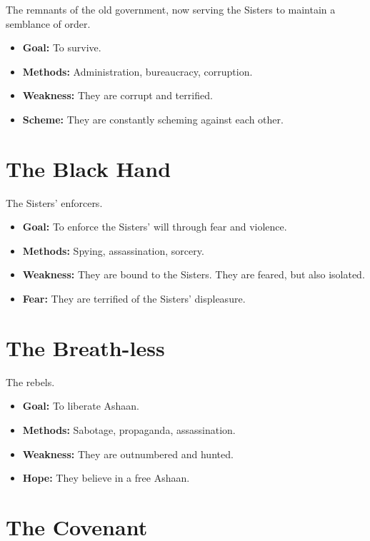 \documentclass[11pt,twoside]{book}
\begin{document}
The remnants of the old government, now serving the Sisters to maintain a semblance of order.

\begin{itemize}
    \item \textbf{Goal:} To survive.
    \item \textbf{Methods:} Administration, bureaucracy, corruption.
    \item \textbf{Weakness:} They are corrupt and terrified.
    \item \textbf{Scheme:} They are constantly scheming against each other.
\end{itemize}

\section{The Black Hand}

The Sisters' enforcers.

\begin{itemize}
    \item \textbf{Goal:} To enforce the Sisters' will through fear and violence.
    \item \textbf{Methods:} Spying, assassination, sorcery.
    \item \textbf{Weakness:} They are bound to the Sisters. They are feared, but also isolated.
    \item \textbf{Fear:} They are terrified of the Sisters' displeasure.
\end{itemize}

\section{The Breath-less}

The rebels.

\begin{itemize}
    \item \textbf{Goal:} To liberate Ashaan.
    \item \textbf{Methods:} Sabotage, propaganda, assassination.
    \item \textbf{Weakness:} They are outnumbered and hunted.
    \item \textbf{Hope:} They believe in a free Ashaan.
\end{itemize}

\section{The Covenant}
\end{document}
